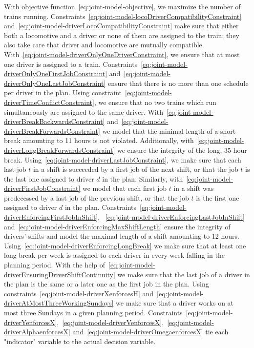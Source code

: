 With objective function~\eqref{eq:joint-model-objective}, we maximize the number of trains running. Constraints~\eqref{eq:joint-model-locoDriverCompatibilityConstraint} and~\eqref{eq:joint-model-driverLocoCompatibilityConstraint} make sure that either both a locomotive and a driver or none of them are assigned to the train; they also take care that driver and locomotive are mutually compatible. With~\eqref{eq:joint-model-driverOnlyOneDriverConstraint}, we ensure that at most one driver is assigned to a train. Constraints~\eqref{eq:joint-model-driverOnlyOneFirstJobConstraint} and~\eqref{eq:joint-model-driverOnlyOneLastJobConstraint} ensure that there is no more than one schedule per driver in the plan. Using constraint~\eqref{eq:joint-model-driverTimeConflictConstraint}, we ensure that no two trains which run simultaneously are assigned to the same driver. With~\eqref{eq:joint-model-driverBreakBackwardsConstraint} and~\eqref{eq:joint-model-driverBreakForwardsConstraint} we model that the minimal length of a short break amounting to 11 hours is not violated. Additionally, with~\eqref{eq:joint-model-driverLongBreakForwardsConstraint} we ensure the integrity of the long, 35-hour break.  Using~\eqref{eq:joint-model-driverLastJobConstraint}, we make sure that each last job $t$ in a shift is succeeded by a first job of the next shift, or that the job $t$ is the last one assigned to driver $d$ in the plan. Similarly, with~\eqref{eq:joint-model-driverFirstJobConstraint} we model that each first job $t$ in a shift was predecessed by a last job of the previous shift, or that the job $t$ is the first one assigned to driver $d$ in the plan. Constraints~\eqref{eq:joint-model-driverEnforcingFirstJobInShift}, ~\eqref{eq:joint-model-driverEnforcingLastJobInShift} and~\eqref{eq:joint-model-driverEnforcingMaxShiftLength} ensure the integrity of drivers' shifts and model the maximal length of a shift amounting to 12 hours. Using~\eqref{eq:joint-model-driverEnforcingLongBreak} we make sure that at least one long break per week is assigned to each driver in every week falling in the planning period. With the help of~\eqref{eq:joint-model-driverEnsuringDriverShiftContinuity} we make sure that the last job of a driver in the plan is the same or a later one as the first job in the plan. Using constraints~\eqref{eq:joint-model-driverXenforcesH} and~\eqref{eq:joint-model-driverAtMostThreeWorkingSundays} we make sure that a driver works on at most three Sundays in a given planning period. Constraints~\eqref{eq:joint-model-driverYenforcesX},~\eqref{eq:joint-model-driverVenforcesX},~\eqref{eq:joint-model-driverAlphaenforcesX} and~\eqref{eq:joint-model-driverOmegaenforcesX} tie each "indicator" variable to the actual decision variable. 


